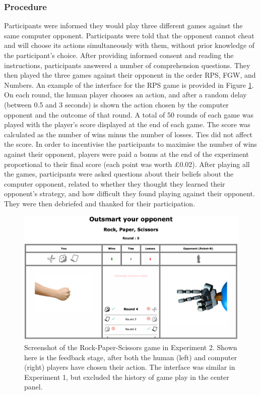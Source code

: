 \documentclass[smallextended]{svjour3}       %
\begin{document}
\hypertarget{procedure}{%
\subsubsection{Procedure}\label{procedure}}

Participants were informed they would play three different games against
the same computer opponent. Participants were told that the opponent
cannot cheat and will choose its actions simultaneously with them,
without prior knowledge of the participant's choice. After providing
informed consent and reading the instructions, participants answered a
number of comprehension questions. They then played the three games
against their opponent in the order RPS, FGW, and Numbers. An example of
the interface for the RPS game is provided in Figure
\ref{fig:feedback-rps-exp2}. On each round, the human player chooses an
action, and after a random delay (between 0.5 and 3 seconds) is shown
the action chosen by the computer opponent and the outcome of that
round. A total of 50 rounds of each game was played with the player's
score displayed at the end of each game. The score was calculated as the
number of wins minus the number of losses. Ties did not affect the
score. In order to incentivise the participants to maximise the number
of wins against their opponent, players were paid a bonus at the end of
the experiment proportional to their final score (each point was worth
£0.02). After playing all the games, participants were asked questions
about their beliefs about the computer opponent, related to whether they
thought they learned their opponent's strategy, and how difficult they
found playing against their opponent. They were then debriefed and
thanked for their participation.

\begin{figure}

{\centering \includegraphics[width=\textwidth]{../Report/images/feedback_rps} 

}

\caption{Screenshot of the Rock-Paper-Scissors game in Experiment 2. Shown here is the feedback stage, after both the human (left) and computer (right) players have chosen their action. The interface was similar in Experiment 1, but excluded the history of game play in the center panel.}\label{fig:feedback-rps-exp2}
\end{figure}
\end{document}
